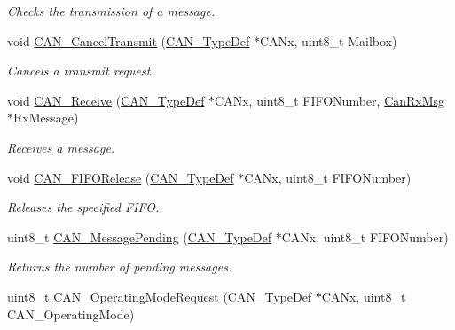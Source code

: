 \begin{DoxyCompactItemize}
\begin{DoxyCompactList}\small\item\em Checks the transmission of a message. \end{DoxyCompactList}\item 
void \mbox{\hyperlink{group___c_a_n___private___functions_ga81106cdf5395a1947bfc87ec1685829e}{C\+A\+N\+\_\+\+Cancel\+Transmit}} (\mbox{\hyperlink{struct_c_a_n___type_def}{C\+A\+N\+\_\+\+Type\+Def}} $\ast$C\+A\+Nx, uint8\+\_\+t Mailbox)
\begin{DoxyCompactList}\small\item\em Cancels a transmit request. \end{DoxyCompactList}\item 
void \mbox{\hyperlink{group___c_a_n___private___functions_ga351b90bb8a3bb0c846f85bbd56ef4dc8}{C\+A\+N\+\_\+\+Receive}} (\mbox{\hyperlink{struct_c_a_n___type_def}{C\+A\+N\+\_\+\+Type\+Def}} $\ast$C\+A\+Nx, uint8\+\_\+t F\+I\+F\+O\+Number, \mbox{\hyperlink{struct_can_rx_msg}{Can\+Rx\+Msg}} $\ast$Rx\+Message)
\begin{DoxyCompactList}\small\item\em Receives a message. \end{DoxyCompactList}\item 
void \mbox{\hyperlink{group___c_a_n___private___functions_ga1bc3b39471e579b4101624c33d27918b}{C\+A\+N\+\_\+\+F\+I\+F\+O\+Release}} (\mbox{\hyperlink{struct_c_a_n___type_def}{C\+A\+N\+\_\+\+Type\+Def}} $\ast$C\+A\+Nx, uint8\+\_\+t F\+I\+F\+O\+Number)
\begin{DoxyCompactList}\small\item\em Releases the specified F\+I\+FO. \end{DoxyCompactList}\item 
uint8\+\_\+t \mbox{\hyperlink{group___c_a_n___private___functions_ga7100459a95ce1b3cfe8ab15e112029fe}{C\+A\+N\+\_\+\+Message\+Pending}} (\mbox{\hyperlink{struct_c_a_n___type_def}{C\+A\+N\+\_\+\+Type\+Def}} $\ast$C\+A\+Nx, uint8\+\_\+t F\+I\+F\+O\+Number)
\begin{DoxyCompactList}\small\item\em Returns the number of pending messages. \end{DoxyCompactList}\item 
uint8\+\_\+t \mbox{\hyperlink{group___c_a_n___private___functions_gab2a3630e9e3024114eb117d14e514208}{C\+A\+N\+\_\+\+Operating\+Mode\+Request}} (\mbox{\hyperlink{struct_c_a_n___type_def}{C\+A\+N\+\_\+\+Type\+Def}} $\ast$C\+A\+Nx, uint8\+\_\+t C\+A\+N\+\_\+\+Operating\+Mode)

\end{DoxyCompactItemize}
